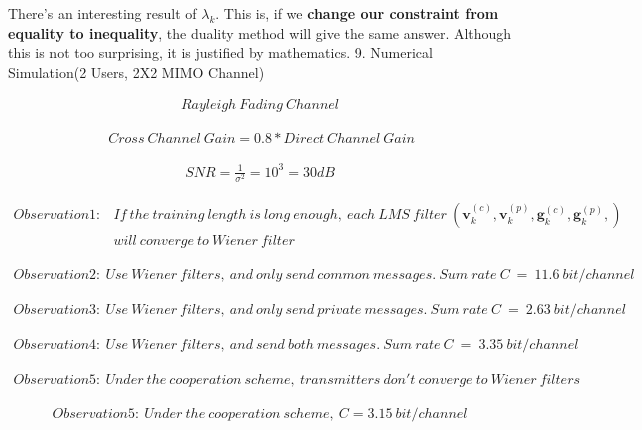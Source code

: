 \documentclass[11pt, oneside]{article}   	%
\begin{document}
\newpage
There's an interesting result of $\lambda_{k}$. This is, if we \textbf{change our constraint from equality to inequality}, the duality method will give the same answer. Although this is not too surprising, it is justified by mathematics.
9. Numerical Simulation(2 Users, 2X2 MIMO Channel)


\begin{align*}
Rayleigh\ Fading\ Channel
\end{align*}

\begin{align*}
\ Cross\ Channel\ Gain = 0.8*Direct\ Channel\ Gain
\end{align*}

\begin{align*}
SNR = \frac {1}{\sigma^2} = 10^3=30dB
\end{align*}

\begin{align*}
Observation1: &If\ the\ training\ length\ is\ long\ enough,\ each\ LMS\ filter\ (\textbf{v}^{(c)}_{k},\textbf{v}^{(p)}_{k},\textbf{g}^{(c)}_{k},\textbf{g}^{(p)}_{k},)\\
&will\ converge\ to\ Wiener\ filter
\end{align*}

\begin{align*}
Observation2:\ Use\ Wiener\ filters,\ and\ only\ send\ common\ messages.\ Sum\ rate\ C\ =\ 11.6\ bit/channel
\end{align*}

\begin{align*}
Observation3:\ Use\ Wiener\ filters,\ and\ only\ send\ private\ messages.\ Sum\ rate\ C\ =\ 2.63\ bit/channel
\end{align*}

\begin{align*}
Observation4:\ Use\ Wiener\ filters,\ and\  send\ both\ messages.\ Sum\ rate\ C\ =\ 3.35\ bit/channel
\end{align*}

\begin{align*}
Observation5:\ Under\ the\ cooperation\ scheme,\ transmitters\ don't\ converge\ to\ Wiener\ filters 
\end{align*}

\begin{align*}
Observation5:\ Under\ the\ cooperation\ scheme,\ C=3.15\ bit/channel
\end{align*}
\end{document}
